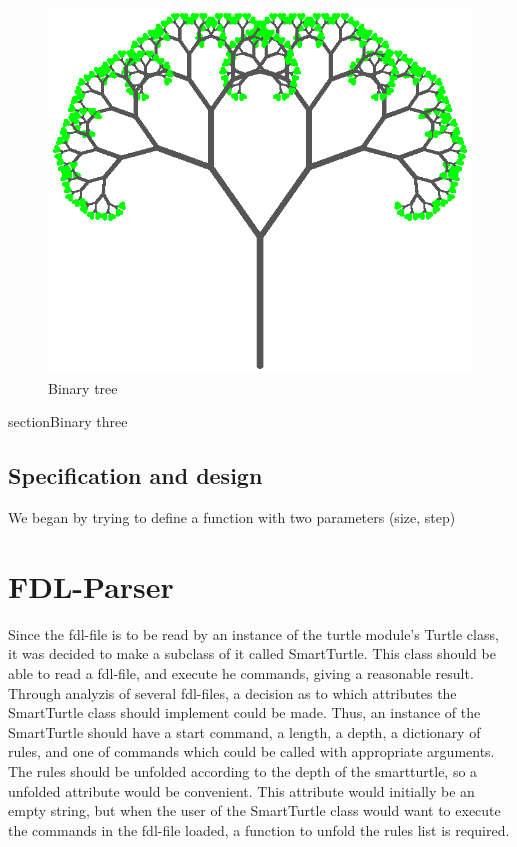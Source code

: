 \documentclass[titlepage]{article}
\begin{document}
\begin{figure}[H]
  \centering
  \includegraphics{bintree}
  \caption{Binary tree}
\end{figure}
section{Binary three}
\subsection{Specification and design}
We began by trying to define a function with two parameters (size, step)
\section{FDL-Parser}
Since the fdl-file is to be read by an instance of the turtle module's Turtle class, it was decided to make a subclass of it called SmartTurtle. This class should be able to read a fdl-file, and execute he commands, giving a reasonable result. Through analyzis of several fdl-files, a decision as to which attributes the SmartTurtle class should implement could be made. Thus, an instance of the SmartTurtle should have a start command, a length, a depth, a dictionary of rules, and one of commands which could be called with appropriate arguments. The rules should be unfolded according to the depth of the smartturtle, so a unfolded attribute would be convenient. This attribute would initially be an empty string, but when the user of the SmartTurtle class would want to execute the commands in the fdl-file loaded, a function to unfold the rules list is required.  
\end{document}
